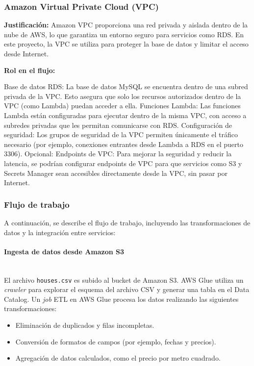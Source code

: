 \documentclass{article}
\begin{document}
\subsubsection{Amazon Virtual Private Cloud (VPC)}
\textbf{Justificación:}
Amazon VPC proporciona una red privada y aislada dentro de la nube de AWS, lo que garantiza un entorno seguro para servicios como RDS. En este proyecto, la VPC se utiliza para proteger la base de datos y limitar el acceso desde Internet.

\textbf{Rol en el flujo:}

Base de datos RDS:
La base de datos MySQL se encuentra dentro de una subred privada de la VPC. Esto asegura que solo los recursos autorizados dentro de la VPC (como Lambda) puedan acceder a ella.
Funciones Lambda:
Las funciones Lambda están configuradas para ejecutar dentro de la misma VPC, con acceso a subredes privadas que les permitan comunicarse con RDS.
Configuración de seguridad:
Los grupos de seguridad de la VPC permiten únicamente el tráfico necesario (por ejemplo, conexiones entrantes desde Lambda a RDS en el puerto 3306).
Opcional: Endpoints de VPC:
Para mejorar la seguridad y reducir la latencia, se podrían configurar endpoints de VPC para que servicios como S3 y Secrets Manager sean accesibles directamente desde la VPC, sin pasar por Internet.



\subsubsection{Flujo de trabajo}
A continuación, se describe el flujo de trabajo, incluyendo las transformaciones de datos y la integración entre servicios:

\paragraph{Ingesta de datos desde Amazon S3} \mbox{} \\
El archivo \texttt{houses.csv} es subido al bucket de Amazon S3.  
AWS Glue utiliza un \textit{crawler} para explorar el esquema del archivo CSV y generar una tabla en el Data Catalog.  
Un \textit{job} ETL en AWS Glue procesa los datos realizando las siguientes transformaciones:
\begin{itemize}
    \item Eliminación de duplicados y filas incompletas.
    \item Conversión de formatos de campos (por ejemplo, fechas y precios).
    \item Agregación de datos calculados, como el precio por metro cuadrado.
\end{itemize}
\end{document}
